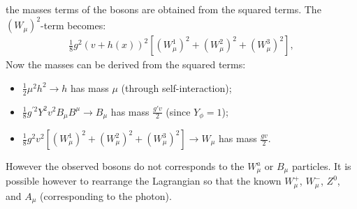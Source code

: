 the masses terms of the bosons are obtained from the squared terms. The $(W_\mu)^2$-term becomes:
\begin{eqnarray}
 \frac{1}{8}g^2 (v + h(x))^2 \left[\left(W_\mu^1\right)^2 + \left(W_\mu^2\right)^2 + \left(W_\mu^3\right)^2 \right], 
\label{eqn:Wsquaredterm}
\end{eqnarray}
Now the masses can be derived from the squared terms:
\begin{itemize}
	\item $\frac{1}{2}\mu^2h^2 \rightarrow h$ has mass $\mu$ (through self-interaction);
	\item $\frac{1}{8}g^{'2}Y^2v^2B_\mu B^\mu \rightarrow B_\mu$ has mass $\frac{g'v}{2}$ (since $Y_\phi =1$);
	\item $\frac{1}{8}g^2 v^2 \left[\left(W_\mu^1\right)^2 + \left(W_\mu^2\right)^2 + \left(W_\mu^3\right)^2 \right] \rightarrow W_\mu $ has mass $\frac{gv}{2}$.
\end{itemize}

However the observed bosons do not corresponds to the $W_\mu^a$ or $B_\mu$ particles. It is possible however to rearrange the Lagrangian so that the known $W_\mu^+$, $W_\mu^-$, $Z^0$, and $A_\mu$ (corresponding to the photon).

